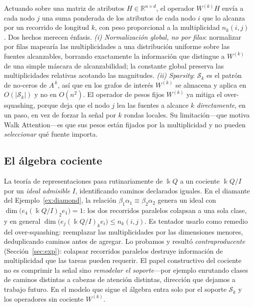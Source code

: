 \documentclass[runningheads]{llncs}
\newcommand{\kk}{\Bbbk}
\newcommand{\kQ}{\kk Q}
\newcommand{\RR}{\mathbb{R}}
\newcommand{\Adj}{A}
\begin{document}
Actuando sobre una matriz de atributos $H\in\RR^{n\times d}$, el operador
$W^{(k)}H$ envía a cada nodo $j$ una suma ponderada de los atributos de cada
nodo $i$ que lo alcanza por un recorrido de longitud $k$, con peso proporcional
a la multiplicidad $n_k(i,j)$. Dos hechos merecen énfasis.
\emph{(i) Normalización global, no por filas}: normalizar por filas mapearía
las multiplicidades a una distribución uniforme sobre las fuentes alcanzables,
borrando exactamente la información que distingue a $W^{(k)}$ de una simple
máscara de alcanzabilidad; la constante global preserva las multiplicidades
relativas acotando las magnitudes. \emph{(ii) Sparsity}: $\mathcal{S}_k$ es el
patrón de no-ceros de $\Adj^{\,k}$, así que en los grafos de interés $W^{(k)}$
se almacena y aplica en $O(|\mathcal{S}_k|)$ y no en $O(n^2)$. El operador de
pesos fijos $W^{(k)}$ ya mitiga el over-squashing, porque deja que el nodo $j$
lea las fuentes a alcance $k$ \emph{directamente}, en un paso, en vez de forzar
la señal por $k$ rondas locales. Su limitación---que motiva Walk Attention---es
que sus pesos están fijados por la multiplicidad y no pueden \emph{seleccionar}
qué fuente importa.

\subsection{El álgebra cociente}

La teoría de representaciones pasa rutinariamente de $\kQ$ a un cociente
$\kQ/I$ por un \emph{ideal admisible} $I$, identificando caminos declarados
iguales. En el diamante del Ejemplo~\ref{ex:diamond}, la relación
$\beta_1\alpha_1\equiv\beta_2\alpha_2$ genera un ideal con
$\dim\bigl(e_4(\kQ/I)_2e_1\bigr)=1$: los dos recorridos paralelos colapsan a
una sola clase, y en general
$\dim\bigl(e_j(\kQ/I)_ke_i\bigr)\le n_k(i,j)$. Es tentador usarlo como remedio
del over-squashing: reemplazar las multiplicidades por las dimensiones menores,
deduplicando caminos antes de agregar. Lo probamos y resultó
\emph{contraproducente}
(Sección~\ref{sec:exp}): colapsar recorridos paralelos destruye información de
multiplicidad que las tareas pueden requerir. El papel constructivo del
cociente no es comprimir la señal sino \emph{remodelar el soporte}---por
ejemplo enrutando clases de caminos distintas a cabezas de atención distintas,
dirección que dejamos a trabajo futuro. En el modelo que sigue el álgebra entra
solo por el soporte $\mathcal{S}_k$ y los operadores sin cociente $W^{(k)}$.
\end{document}
